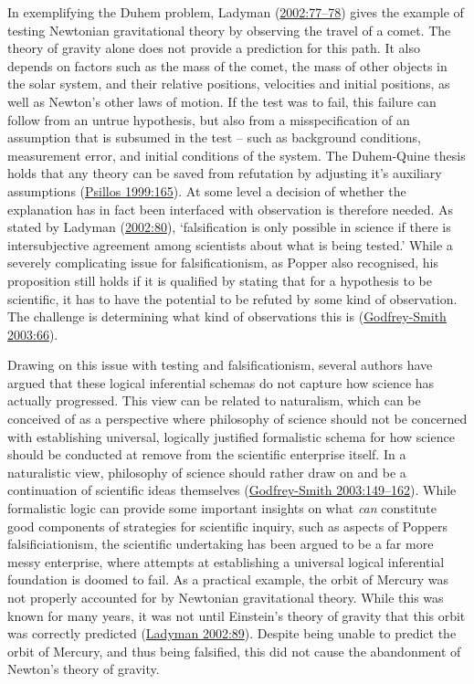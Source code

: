 \documentclass[
  12pt,
  a4paper,
  oneside]{book}
\begin{document}
In exemplifying the Duhem problem, Ladyman (\protect\hyperlink{ref-ladyman2002}{2002:77--78}) gives the example of testing Newtonian gravitational theory by observing the travel of a comet. The theory of gravity alone does not provide a prediction for this path. It also depends on factors such as the mass of the comet, the mass of other objects in the solar system, and their relative positions, velocities and initial positions, as well as Newton's other laws of motion. If the test was to fail, this failure can follow from an untrue hypothesis, but also from a misspecification of an assumption that is subsumed in the test -- such as background conditions, measurement error, and initial conditions of the system. The Duhem-Quine thesis holds that any theory can be saved from refutation by adjusting it's auxiliary assumptions (\protect\hyperlink{ref-psillos1999}{Psillos 1999:165}). At some level a decision of whether the explanation has in fact been interfaced with observation is therefore needed. As stated by Ladyman (\protect\hyperlink{ref-ladyman2002}{2002:80}), `falsification is only possible in science if there is intersubjective agreement among scientists about what is being tested.' While a severely complicating issue for falsificationism, as Popper also recognised, his proposition still holds if it is qualified by stating that for a hypothesis to be scientific, it has to have the potential to be refuted by some kind of observation. The challenge is determining what kind of observations this is (\protect\hyperlink{ref-godfrey-smith2003}{Godfrey-Smith 2003:66}).

Drawing on this issue with testing and falsificationism, several authors have argued that these logical inferential schemas do not capture how science has actually progressed. This view can be related to naturalism, which can be conceived of as a perspective where philosophy of science should not be concerned with establishing universal, logically justified formalistic schema for how science should be conducted at remove from the scientific enterprise itself. In a naturalistic view, philosophy of science should rather draw on and be a continuation of scientific ideas themselves (\protect\hyperlink{ref-godfrey-smith2003}{Godfrey-Smith 2003:149--162}). While formalistic logic can provide some important insights on what \emph{can} constitute good components of strategies for scientific inquiry, such as aspects of Poppers falsificiationism, the scientific undertaking has been argued to be a far more messy enterprise, where attempts at establishing a universal logical inferential foundation is doomed to fail. As a practical example, the orbit of Mercury was not properly accounted for by Newtonian gravitational theory. While this was known for many years, it was not until Einstein's theory of gravity that this orbit was correctly predicted (\protect\hyperlink{ref-ladyman2002}{Ladyman 2002:89}). Despite being unable to predict the orbit of Mercury, and thus being falsified, this did not cause the abandonment of Newton's theory of gravity.
\end{document}
